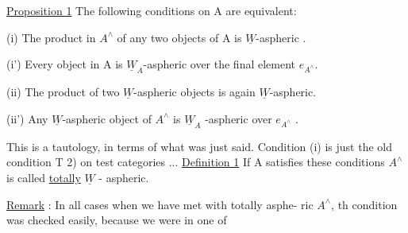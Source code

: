 \uline{Proposition 1}   The following conditions on A are equivalent:

(i)  The product  in $A^\wedge$ of any two objects of A is $\underline{W}$-aspheric .

(i') Every object in A is $\underline{W}_A$-aspheric over the final element $e_{A^\wedge}$.

(ii) The product of two $\underline{W}$-aspheric objects  is again $\underline{W}$-aspheric.

(ii')  Any $\underline{W}$-aspheric object of $A^\wedge$ is $\underline{W}_A$ -aspheric over $e_{A^\wedge}$ .

This is  a tautology,  in terms of what was just said.  Condition
(i)  is just the old condition T 2) on test categories ...
\uline{Definition 1}   If A satisfies these conditions\hand{,} $A^\wedge$is called \uline{totally} 
\uline{$\underline{W}$} - aspheric\hand{(*)}.

\uline{Remark} :  In all  cases when we have  met with totally asphe-%
ric $A^\wedge$,  th condition was checked easily,  because we were in one of
